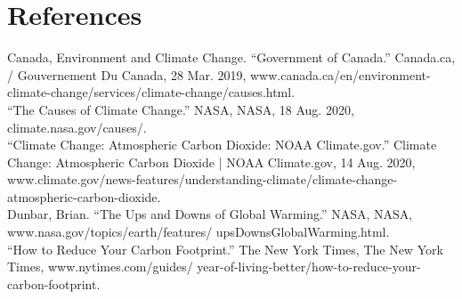 \documentclass[fontsize=11pt]{article}
\begin{document}
\section*{References}

Canada, Environment and Climate Change. “Government of Canada.” Canada.ca, / Gouvernement Du Canada, 28 Mar. 2019, www.canada.ca/en/environment-climate-change/services/climate-change/causes.html. \\

“The Causes of Climate Change.” NASA, NASA, 18 Aug. 2020, climate.nasa.gov/causes/.\\

“Climate Change: Atmospheric Carbon Dioxide: NOAA Climate.gov.” Climate Change: Atmospheric Carbon Dioxide | NOAA Climate.gov, 14 Aug. 2020, www.climate.gov/news-features/understanding-climate/climate-change-atmospheric-carbon-dioxide.\\

Dunbar, Brian. “The Ups and Downs of Global Warming.” NASA, NASA, www.nasa.gov/topics/earth/features/
upsDownsGlobalWarming.html.\\

“How to Reduce Your Carbon Footprint.” The New York Times, The New York Times, www.nytimes.com/guides/
year-of-living-better/how-to-reduce-your-carbon-footprint.
\end{document}
